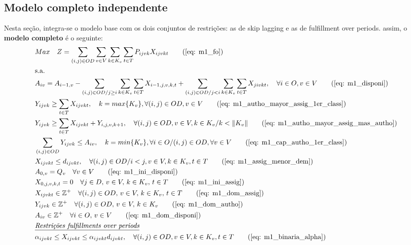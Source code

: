 \subsection{Modelo completo independente}
Nesta seção, integra-se o modelo base com os dois conjuntos de restrições: as de skip lagging e as de fulfillment over periods.
assim, o \textbf{modelo completo} é o seguinte:
\allowdisplaybreaks
\begin{align}
	& Max \quad Z = \sum_{(i,j)\in OD} \sum_{v\in V} \sum_{k\in K_v} \sum_{t\in T} P_{ijvk} X_{ijvkt}     \tag{\ref{eq: m1_fo}}   \\
	& \text{s.a.}  \notag \\
	& A_{iv} = A_{i-1,v} - \sum_{(i,j) \in OD/j \geq i} \sum_{k\in K_v}\sum_{t\in T}X_{i-1,j,v,k,t} + \sum_{(i,j) \in OD/j<i} \sum_{k\in K_v}\sum_{t\in T}X_{jivkt}, \quad \forall i \in O, v \in V   \tag{\ref{eq: m1_disponi}} \\
	& Y_{ijvk} \geq  \sum_{t \in T} X_{ijvkt},  \quad k = max\{K_v\}, \forall(i,j) \in OD ,v \in V     \tag{\ref{eq: m1_autho_mayor_assig_1er_class}} \\
	& Y_{ijvk} \geq  \sum_{t \in T} X_{ijvkt} + Y_{i,j,v,k + 1} , \quad \forall(i,j) \in OD, v \in V, k \in K_v / k < \lVert K_v \rVert   \tag{\ref{eq: m1_autho_mayor_assig_mas_autho}} \\
	& \sum_{(i,j) \in OD} Y_{ijvk} \leq A_{iv}, \quad  k = min\{K_v\}, \forall i \in O / (i,j) \in OD,   \forall v \in V       \tag{\ref{eq: m1_cap_autho_1er_class}} \\
	& X_{ijvkt} \leq d_{ijvkt},  \quad \forall (i,j) \in OD / i < j  ,v \in V, k \in K_v, t\in T   \tag{\ref{eq: m1_assig_menor_dem}} \\
	& A_{0,v} = Q_v \quad \forall v \in V  \tag{\ref{eq: m1_ini_disponi}} \\ 
	& X_{0,j,v,k,t} = 0 \quad \forall j \in D,\, v \in V,\, k \in K_v,\, t \in T  \tag{\ref{eq: m1_ini_assig}} \\ 
	& X_{ijvkt} \in \mathbb{Z}^+ \quad \forall(i,j) \in OD,\, v \in V,\, k \in K_v,\, t \in T  \tag{\ref{eq: m1_dom_assig}} \\ 
	& Y_{ijvk} \in \mathbb{Z}^+ \quad \forall(i,j) \in OD,\, v \in V,\, k \in K_v  \tag{\ref{eq: m1_dom_autho}} \\ 
	& A_{iv} \in \mathbb{Z}^+ \quad \forall i \in O,\, v \in V  \tag{\ref{eq: m1_dom_disponi}} \\
	& \textit{\underline{Restrições fulfillments over periods}}         \notag   \\
	& \alpha_{ijvkt} \leq X_{ijvkt} \leq \alpha_{ijvkt}d_{ijvkt}, \quad   \forall(i,j) \in OD, v \in V, k \in K_v, t \in T   \tag{\ref{eq: m1_binaria_alpha}} \\

\end{align}
